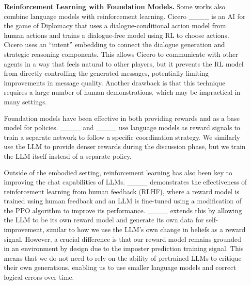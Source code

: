 \smallskip

\noindent \textbf{Reinforcement Learning with Foundation Models.}
Some works also combine language models with reinforcement learning. Cicero ____ is an AI for the game of Diplomacy that uses a dialogue-conditional action model from human actions and trains a dialogue-free model using RL to choose actions. Cicero uses an ``intent'' embedding to connect the dialogue generation and strategic reasoning components. This allows Cicero to communicate with other agents in a way that feels natural to other players, but it prevents the RL model from directly controlling the generated messages, potentially limiting improvements in message quality. Another drawback is that this technique requires a large number of human demonstrations, which may be impractical in many settings.

Foundation models have been effective in both providing rewards and as a base model for policies. ____ and ____ use language models as reward signals to train a separate network to follow a specific coordination strategy. We similarly use the LLM to provide denser rewards during the discussion phase, but we train the LLM itself instead of a separate policy. 

Outside of the embodied setting, reinforcement learning has also been key to improving the chat capabilities of LLMs. ____ demonstrates the effectiveness of reinforcement learning from human feedback (RLHF), where a reward model is trained using human feedback and an LLM is fine-tuned using a modification of the PPO algorithm to improve its performance. ____ extends this by allowing the LLM to be its own reward model and generate its own data for self-improvement, similar to how we use the LLM's own change in beliefs as a reward signal. However, a crucial difference is that our reward model remains grounded in an environment by design due to the imposter prediction training signal. This means that we do not need to rely on the ability of pretrained LLMs to critique their own generations, enabling us to use smaller language models and correct logical errors over time.